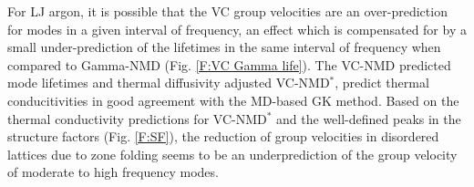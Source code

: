 \documentclass[aps,prb,onecolumn,preprint,superscriptaddress,amsmath,amssymb,floatfix]{revtex4}
\newcommand{\kv}{\mspace{-4.0mu}\left(\mspace{-8.0mu}
\begin{smallmatrix}&\pmb{\kappa} \\&\nu\end{smallmatrix}
\mspace{-3.0mu}\right)}
\begin{document}
For LJ argon, it is possible that the VC group velocities are an 
over-prediction for modes in a given interval of frequency, 
an effect which is compensated for 
by a small under-prediction of the lifetimes in the same interval of 
frequency when compared to Gamma-NMD (Fig. \ref{F:VC Gamma life}). 
The VC-NMD predicted 
mode lifetimes and thermal diffusivity adjusted VC-NMD$^*$, 
predict thermal conducitivities in good agreement with 
the MD-based GK method. 
Based on the thermal conductivity predictions for VC-NMD$^*$ and 
the well-defined peaks in the structure factors 
(Fig. \ref{F:SF}), the reduction of group velocities in 
disordered lattices 
due to zone folding seems to be an underprediction of the group 
velocity of moderate to high frequency modes.\cite{duda_reducing_2011}  



\end{document}
